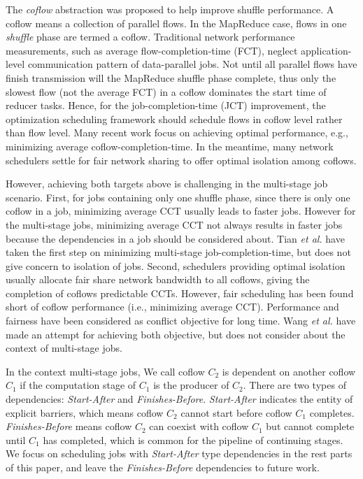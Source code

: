 \documentclass[10pt, conference, letterpaper]{IEEEtran}
\begin{document}
The \emph{coflow} abstraction was proposed to help improve shuffle performance. A coflow means a collection of parallel flows\cite{coflow}. In the MapReduce case, flows in one \emph{shuffle} phase are termed a coflow. Traditional network performance measurements, such as average flow-completion-time (FCT), neglect application-level communication pattern of data-parallel jobs. Not until all parallel flows have finish transmission will the MapReduce shuffle phase complete, thus only the slowest flow (not the average FCT) in a coflow dominates the start time of reducer tasks. Hence, for the job-completion-time (JCT) improvement, the optimization scheduling framework should schedule flows in coflow level rather than flow level. Many recent work focus on achieving optimal performance, e.g., minimizing average coflow-completion-time\cite{varys,aalo,coda,barrat,stream}. In the meantime, many network schedulers settle for fair network sharing to offer optimal isolation among coflows\cite{HUG,DRF,faircloud,fair}.

However, achieving both targets above is challenging in the multi-stage job scenario. First, for jobs containing only one shuffle phase, since there is only one coflow in a job, minimizing average CCT usually leads to faster jobs. However for the multi-stage jobs, minimizing average CCT not always results in faster jobs because the dependencies in a job should be considered about. Tian \emph{et al.}\cite{bingchuan} have taken the first step on minimizing multi-stage job-completion-time, but does not give concern to isolation of jobs. Second, schedulers providing optimal isolation usually allocate fair share network bandwidth to all coflows, giving the completion of coflows predictable CCTs. However, fair scheduling has been found short of coflow performance (i.e., minimizing average CCT)\cite{HUG}. Performance and fairness have been considered as conflict objective for long time. Wang \emph{et al.}\cite{utopia} have made an attempt for achieving both objective, but does not consider about the context of multi-stage jobs.

In the context multi-stage jobs, We call coflow $C_2$ is dependent on another coflow $C_1$ if the computation stage of $C_1$ is the producer of $C_2$. There are two types of dependencies: \emph{Start-After} and \emph{Finishes-Before}. \emph{Start-After} indicates the entity of explicit barriers\cite{Hadoop}, which means coflow $C_2$ cannot start before coflow $C_1$ completes. \emph{Finishes-Before} means coflow $C_2$ can coexist with coflow $C_1$ but cannot complete until $C_1$ has completed, which is common for the pipeline of continuing stages\cite{dryad}. We focus on scheduling jobs with \emph{Start-After} type dependencies in the rest parts of this paper, and leave the \emph{Finishes-Before} dependencies to future work.
\end{document}
